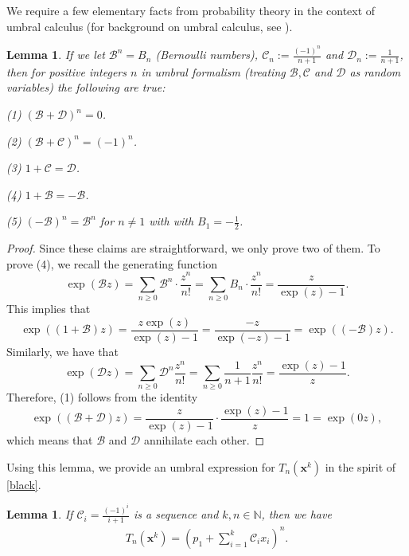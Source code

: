 \documentclass[11pt]{amsart}
\newtheorem{lemma}[theorem]{Lemma}
\theoremstyle{definition}
\theoremstyle{remark}
\numberwithin{equation}{section}
\begin{document}
We require a few elementary facts from probability theory in the context of umbral calculus (for background on umbral calculus, see \cite{RR}). 

\begin{lemma} \label{lemma1} If we let $\mathcal{B}^n=B_n$ (Bernoulli numbers), $\mathcal{C}_n:=\frac{(-1)^n}{n+1}$ and $\mathcal{D}_n:=\frac1{n+1}$, then for positive integers $n$ in umbral formalism (treating $\mathcal{B}, \mathcal{C}$ and $\mathcal{D}$ as random variables) the following are true:

\smallskip
\noindent
(1) $(\mathcal{B}+\mathcal{D})^n=0$.

\noindent
(2) $(\mathcal{B}+\mathcal{C})^n=(-1)^n$.

\noindent
(3) $1+\mathcal{C}=\mathcal{D}$.

\noindent
(4) $1+\mathcal{B}=-\mathcal{B}$. 

\noindent
(5) $(-\mathcal{B})^n=\mathcal{B}^n$ for $n\neq1$ with with $B_1 = -\frac12$.
\end{lemma}
\begin{proof} Since these claims are straightforward, we only prove two of them.
To prove (4), we recall the generating function $$\exp(\mathcal{B}z)
=\sum_{n\geq0}\mathcal{B}^n\cdot \frac{z^n}{n!}=\sum_{n\geq0} B_n\cdot \frac{z^n}{n!}=\frac{z}{\exp(z)-1}.$$
This implies that
 $$\exp((1+\mathcal{B})z)=\frac{z\exp(z)}{\exp(z)-1}=\frac{-z}{\exp(-z)-1}=\exp((-\mathcal{B})z).$$
Similarly, we have that
$$\exp(\mathcal{D}z)=\sum_{n\geq0}\mathcal{D}^n\frac{z^n}{n!}=\sum_{n\geq0}\frac1{n+1}\frac{z^n}{n!}=\frac{\exp(z)-1}z.
$$
Therefore, (1) follows from the identity
 $$\exp((\mathcal{B}+\mathcal{D})z)=\frac{z}{\exp(z)-1}\cdot \frac{\exp(z)-1}z=1=\exp(0z),$$
 which means that $\mathcal{B}$ and $\mathcal{D}$ annihilate each other. 
\end{proof}


Using this lemma, we provide an umbral expression for $T_n(\pmb{x}^k)$ in the spirit of \eqref{black}. 

\begin{lemma} \label{conjTA} If $\mathcal{C}_i=\frac{(-1)^i}{i+1}$ is a sequence and $ k, n\in\mathbb{N}$, then we have
\begin{align*} T_n(\pmb{x}^k)=\left(p_1+\sum_{i=1}^k\mathcal{C}_i x_i\right)^n. \end{align*}
\end{lemma}
\end{document}
